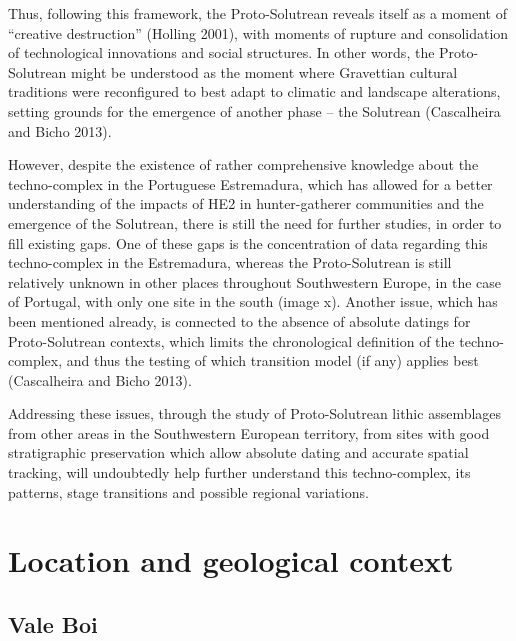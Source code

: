 \documentclass[12pt,twoside]{reedthesis}
\begin{document}
Thus, following this framework, the Proto-Solutrean reveals itself as a moment of ``creative destruction'' (Holling 2001), with moments of rupture and consolidation of technological innovations and social structures. In other words, the Proto-Solutrean might be understood as the moment where Gravettian cultural traditions were reconfigured to best adapt to climatic and landscape alterations, setting grounds for the emergence of another phase -- the Solutrean (Cascalheira and Bicho 2013).

However, despite the existence of rather comprehensive knowledge about the techno-complex in the Portuguese Estremadura, which has allowed for a better understanding of the impacts of HE2 in hunter-gatherer communities and the emergence of the Solutrean, there is still the need for further studies, in order to fill existing gaps. One of these gaps is the concentration of data regarding this techno-complex in the Estremadura, whereas the Proto-Solutrean is still relatively unknown in other places throughout Southwestern Europe, in the case of Portugal, with only one site in the south (image x). Another issue, which has been mentioned already, is connected to the absence of absolute datings for Proto-Solutrean contexts, which limits the chronological definition of the techno-complex, and thus the testing of which transition model (if any) applies best (Cascalheira and Bicho 2013).

Addressing these issues, through the study of Proto-Solutrean lithic assemblages from other areas in the Southwestern European territory, from sites with good stratigraphic preservation which allow absolute dating and accurate spatial tracking, will undoubtedly help further understand this techno-complex, its patterns, stage transitions and possible regional variations.

\hypertarget{location-and-geological-context}{%
\chapter{Location and geological context}\label{location-and-geological-context}}

\hypertarget{vale-boi}{%
\section{Vale Boi}\label{vale-boi}}
\end{document}
